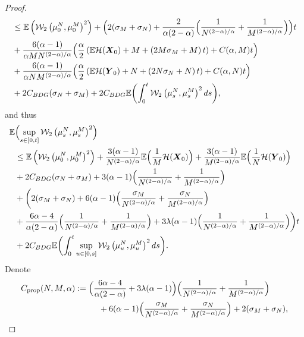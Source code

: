 \documentclass[10pt]{amsart}
\newcommand{\bX}{{\boldsymbol{X}}}
\newcommand{\bY}{{\boldsymbol{Y}}}
\theoremstyle{plain}
\theoremstyle{definition}
\begin{document}
\begin{proof}
\begin{align*}
&\leq \mathbb{E}\left(\mathcal{W}_2\left(\mu_0^N,\mu_0^M\right)^2\right)+\Bigl(2(\sigma_M+\sigma_N)+\frac{2}{\alpha(2-\alpha)}\Bigl(\frac{1}{N^{(2-\alpha)/\alpha}}+\frac{1}{M^{(2-\alpha)/\alpha}}\Bigr)\Bigr)t\\
&+\frac{6(\alpha-1)}{\alpha MN^{(2-\alpha)/\alpha}}\Bigl(\frac{\alpha}{2}\left(\mathbb{E}\mathcal{H}(\bX_0)+M+\left(2M\sigma_M+M\right)t\right)+C(\alpha,M)t\Bigr)\\
&+\frac{6(\alpha-1)}{\alpha NM^{(2-\alpha)/\alpha}}\Bigl(\frac{\alpha}{2}\left(\mathbb{E}\mathcal{H}(\bY_0)+N+\left(2N\sigma_N+N\right)t\right)+C(\alpha,N)t\Bigr)\\
&+2C_{BDG}(\sigma_N+\sigma_M)+2C_{BDG}\mathbb{E}\biggl(\int_0^t\mathcal{W}_2\left(\mu_s^N,\mu_s^M\right)^2ds\biggr),
\end{align*}
and thus\vspace*{-3pt}
\begin{align*}
\mathbb{E}&\Bigl(\sup_{s\in[0,t]}\mathcal{W}_2\left(\mu_s^N,\mu_s^M\right)^2\Bigr)\\
&\leq \mathbb{E}\left(\mathcal{W}_2\left(\mu_0^N,\mu_0^M\right)^2\right)+\frac{3(\alpha-1)}{ N^{(2-\alpha)/\alpha}}\mathbb{E}\Bigl(\frac{1}{M}\mathcal{H}(\bX_0)\Bigr)+\frac{3(\alpha-1)}{M^{(2-\alpha)/\alpha}}\mathbb{E}\Bigl(\frac{1}{N}\mathcal{H}(\bY_0)\Bigr)\\
&+2C_{BDG}(\sigma_N+\sigma_M)+3(\alpha-1)\Bigl(\frac{1}{N^{(2-\alpha)/\alpha}}+\frac{1}{M^{(2-\alpha)/\alpha}}\Bigr)\\
&+\biggl(2(\sigma_M+\sigma_N)+6(\alpha-1)\Bigl(\frac{\sigma_M}{N^{(2-\alpha)/\alpha}}+\frac{\sigma_N}{M^{(2-\alpha)/\alpha}}\Bigr)\\
&+\frac{6\alpha-4}{\alpha(2-\alpha)}\Bigl(\frac{1}{N^{(2-\alpha)/\alpha}}+\frac{1}{M^{(2-\alpha)/\alpha}}\Bigr)+3\lambda(\alpha-1)\Bigl(\frac{1}{N^{(2-\alpha)/\alpha}}+\frac{1}{M^{(2-\alpha)/\alpha}}\Bigr)\biggr)t\\
&+2C_{BDG}\mathbb{E}\biggl(\int_0^t\sup_{u\in[0,s]}\mathcal{W}_2\left(\mu_u^N,\mu_u^M\right)^2ds\biggr).
\end{align*}
Denote
\begin{align*}
C_{\text{prop}}(N,M,\alpha)&:=\Bigl(\frac{6\alpha-4}{\alpha(2-\alpha)}+3\lambda(\alpha-1)\Bigr)\Bigl(\frac{1}{N^{(2-\alpha)/\alpha}}+\frac{1}{M^{(2-\alpha)/\alpha}}\Bigr)\\
&\hspace*{1cm}+6(\alpha-1)\Bigl(\frac{\sigma_M}{N^{(2-\alpha)/\alpha}}+\frac{\sigma_N}{M^{(2-\alpha)/\alpha}}\Bigr)+2(\sigma_M+\sigma_N),\\

\end{align*}
\end{proof}
\end{document}
